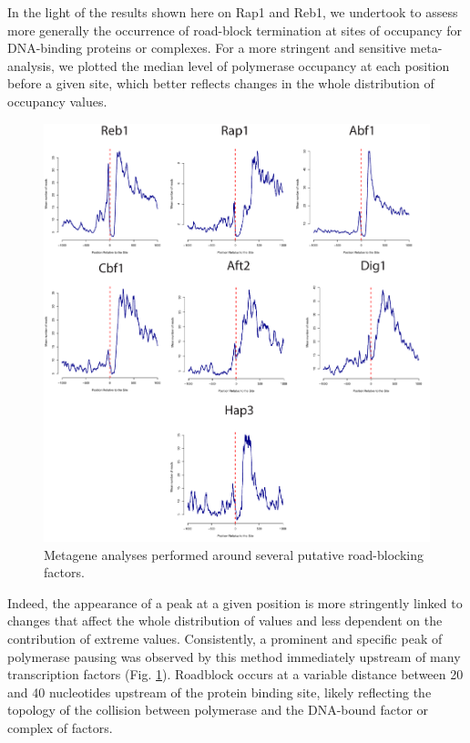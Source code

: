 In the light of the results shown here on Rap1 and Reb1, we undertook to assess more generally the occurrence of road-block termination at sites of occupancy for DNA-binding proteins or complexes. For a more stringent and sensitive meta-analysis, we plotted the median level of polymerase occupancy at each position before a given site, which better reflects changes in the whole distribution of occupancy values. 
\begin{figure}[h!]

\centering
\includegraphics[width=\textwidth]{figures/results/rap/nine.pdf}
\caption[Metagene analysis around several putative road-blocking factors]{Metagene analyses performed around several putative road-blocking factors.}
\label{fig:nine}

\end{figure}
Indeed, the appearance of a peak at a given position is more stringently linked to changes that affect the whole distribution of values and less dependent on the contribution of extreme values. Consistently, a prominent and specific peak of polymerase pausing was observed by this method immediately upstream of many transcription factors (Fig. \ref{fig:nine}).  
Roadblock occurs at a variable distance between 20 and 40 nucleotides upstream of the protein binding site, likely reflecting the topology of the collision between polymerase and the DNA-bound factor or complex of factors. 

